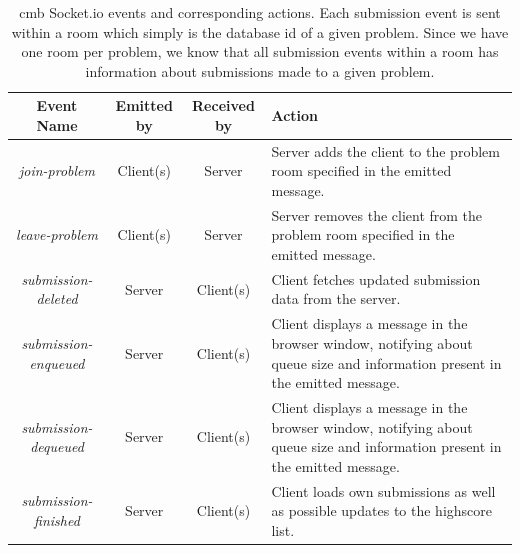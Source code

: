 \begin{table}[t!]
    \centering
    \begin{tabular}{ | c | c | c | p{3.5cm} | }
    \hline
    \textbf{Event Name} & \textbf{Emitted by} & \textbf{Received by} & \textbf{Action}\\
    \hline
    \textit{join-problem} & Client(s) & Server & Server adds the client to the problem room specified in the emitted message. \\ \hline
    \textit{leave-problem} & Client(s) & Server & Server removes the client from the problem room specified in the emitted message. \\ \hline
    \textit{submission-deleted} & Server & Client(s) & Client fetches updated submission data from the server. \\ \hline
    \textit{submission-enqueued} & Server & Client(s) & Client displays a message in the browser window, notifying about queue size and information present in the emitted message. \\ \hline
    \textit{submission-dequeued} & Server & Client(s) & Client displays a message in the browser window, notifying about queue size and information present in the emitted message. \\ \hline
    \textit{submission-finished} & Server & Client(s) & Client loads own submissions as well as possible updates to the highscore list. \\ \hline
    \end{tabular}
    \caption[\gls{cmb} Socket.io events and corresponding actions]{\gls{cmb} Socket.io events and corresponding actions. Each submission event is sent within a room which simply is the database id of a given problem. Since we have one room per problem, we know that all submission events within a room has information about submissions made to a given problem.}
    \label{tab:cmb-socketio-events}
\end{table}

